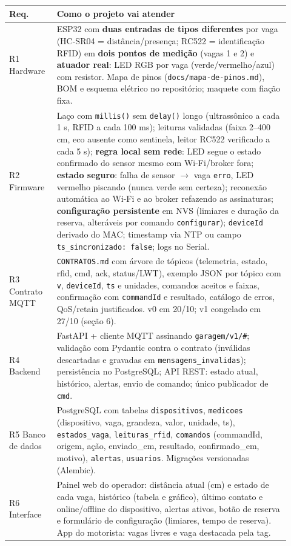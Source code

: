 \documentclass[11pt,a4paper]{article}
\newcommand{\cod}[1]{\texttt{#1}}
\begin{document}
\begin{longtable}{|p{0.15\linewidth}|p{0.77\linewidth}|}
\hline
\textbf{Req.} & \textbf{Como o projeto vai atender} \\ \hline \endhead
R1 Hardware & ESP32 com \textbf{duas entradas de tipos diferentes} por vaga (HC-SR04 = distância/presença; RC522 = identificação RFID) em \textbf{dois pontos de medição} (vagas 1 e 2) e \textbf{atuador real}: LED RGB por vaga (verde/vermelho/azul) com resistor. Mapa de pinos (\cod{docs/mapa-de-pinos.md}), BOM e esquema elétrico no repositório; maquete com fiação fixa. \\ \hline
R2 Firmware & Laço com \cod{millis()} sem \cod{delay()} longo (ultrassônico a cada 1 s, RFID a cada 100 ms); leituras validadas (faixa 2--400 cm, eco ausente como sentinela, leitor RC522 verificado a cada 5 s); \textbf{regra local sem rede}: LED segue o estado confirmado do sensor mesmo com Wi-Fi/broker fora; \textbf{estado seguro}: falha de sensor $\rightarrow$ vaga \cod{erro}, LED vermelho piscando (nunca verde sem certeza); reconexão automática ao Wi-Fi e ao broker refazendo as assinaturas; \textbf{configuração persistente} em NVS (limiares e duração da reserva, alteráveis por comando \cod{configurar}); \cod{deviceId} derivado do MAC; timestamp via NTP ou campo \cod{ts\_sincronizado: false}; logs no Serial. \\ \hline
R3 Contrato MQTT & \cod{CONTRATOS.md} com árvore de tópicos (telemetria, estado, rfid, cmd, ack, status/LWT), exemplo JSON por tópico com \cod{v}, \cod{deviceId}, \cod{ts} e unidades, comandos aceitos e faixas, confirmação com \cod{commandId} e resultado, catálogo de erros, QoS/retain justificados. v0 em 20/10; v1 congelado em 27/10 (seção 6). \\ \hline
R4 Backend & FastAPI + cliente MQTT assinando \cod{garagem/v1/\#}; validação com Pydantic contra o contrato (inválidas descartadas e gravadas em \cod{mensagens\_invalidas}); persistência no PostgreSQL; API REST: estado atual, histórico, alertas, envio de comando; único publicador de \cod{cmd}. \\ \hline
R5 Banco de dados & PostgreSQL com tabelas \cod{dispositivos}, \cod{medicoes} (dispositivo, vaga, grandeza, valor, unidade, ts), \cod{estados\_vaga}, \cod{leituras\_rfid}, \cod{comandos} (commandId, origem, ação, enviado\_em, resultado, confirmado\_em, motivo), \cod{alertas}, \cod{usuarios}. Migrações versionadas (Alembic). \\ \hline
R6 Interface & Painel web do operador: distância atual (cm) e estado de cada vaga, histórico (tabela e gráfico), último contato e online/offline do dispositivo, alertas ativos, botão de reserva e formulário de configuração (limiares, tempo de reserva). App do motorista: vagas livres e vaga destacada pela tag. \\ \hline

\end{longtable}
\end{document}
